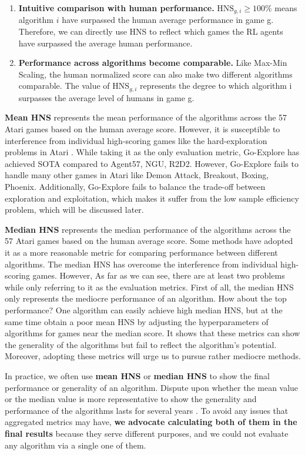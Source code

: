 \documentclass[nohyperref]{article}
\theoremstyle{plain}
\begin{document}
\begin{enumerate}
    \item \textbf{Intuitive comparison with human performance.} $\text{HNS}_{g,i} \geq 100\%$ means algorithm $i$ have surpassed the human average performance in game g. Therefore, we can directly use HNS to reflect which games the RL agents have surpassed the average human performance. 
    \item \textbf{Performance across algorithms become comparable.} Like Max-Min Scaling, the human normalized score can also make two different algorithms comparable. The value of $\text{HNS}_{g,i}$ represents the degree to which algorithm i surpasses the average level of humans in game g.
\end{enumerate}

\textbf{Mean HNS} represents the mean performance of the algorithms across the 57 Atari games  based on the human average score. However, it is susceptible to interference from individual high-scoring games like the hard-exploration problems in Atari \citep{goexplore}. While taking it as the only evaluation metric, Go-Explore\citep{goexplore} has achieved SOTA compared to Agent57\citep{agent57}, NGU\citep{ngu}, R2D2\citep{r2d2}. However, Go-Explore fails to handle many other games in Atari like Demon Attack, Breakout, Boxing, Phoenix. Additionally, Go-Explore fails to balance the trade-off between exploration and exploitation, which makes it suffer from the low sample efficiency problem, which will be discussed later.

\textbf{Median HNS} represents the median performance of the algorithms across the 57 Atari games based on the human average score. Some methods \citep{muzero,muesli} have adopted it as a more reasonable metric for comparing performance between different algorithms. The median HNS has overcome the interference from individual high-scoring games. However, As far as we can see, there are at least two problems while only referring to it as the evaluation metrics. First of all, the median HNS only represents the mediocre performance of an algorithm. How about the top performance? One algorithm \citep{muesli} can easily achieve high median HNS, but at the same time obtain a poor mean HNS by adjusting the hyperparameters of algorithms for games near the median score. It shows that these metrics can show the generality of the algorithms but fail to reflect the algorithm's potential. Moreover, adopting these metrics will urge us to pursue rather mediocre methods.


In practice, we often use \textbf{mean HNS} or \textbf{median HNS} to show the final performance or generality of an algorithm. Dispute upon whether the mean value or the median value is more representative to show the generality and performance of the algorithms lasts for several years \citep{dqn,rainbow,dreamerv2,muesli,ale,ale2}. To avoid any issues that aggregated metrics may have, \textbf{we advocate calculating both of them in the final results} because they serve different purposes, and we could not evaluate any algorithm via a single one of them. 
\end{document}
